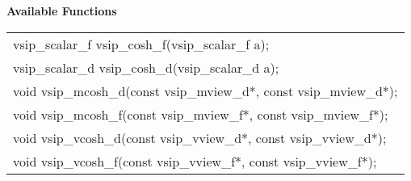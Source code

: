 \\\cvsiplh
\\ \hspace*{.8cm} \vspace*{.1cm} \textbf{Available Functions }
\\ \hspace*{1.1cm} {
\ttfamily
\begin{tabular}[H]{l}
vsip\_scalar\_f vsip\_cosh\_f(vsip\_scalar\_f a);\\
vsip\_scalar\_d vsip\_cosh\_d(vsip\_scalar\_d a);\\
void vsip\_mcosh\_d(const vsip\_mview\_d*, const vsip\_mview\_d*);\\
void vsip\_mcosh\_f(const vsip\_mview\_f*, const vsip\_mview\_f*);\\
void vsip\_vcosh\_d(const vsip\_vview\_d*, const vsip\_vview\_d*);\\
void vsip\_vcosh\_f(const vsip\_vview\_f*, const vsip\_vview\_f*);\\
\end{tabular}
}
\\\pyjvsiph
{}
